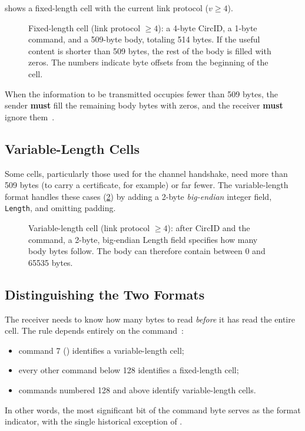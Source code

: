  shows a fixed-length cell with the current link protocol ($v\ge4$).

\begin{figure}[htbp]
\centering

\caption{Fixed-length cell (link protocol $\ge 4$): a 4-byte CircID, a 1-byte command, and a 509-byte body, totaling 514 bytes. If the useful content is shorter than 509 bytes, the rest of the body is filled with zeros. The numbers indicate byte offsets from the beginning of the cell.}
\label{fig:cella-fissa}
\end{figure}

When the information to be transmitted occupies fewer than 509 bytes, the sender \textbf{must} fill the remaining body bytes with zeros, and the receiver \textbf{must} ignore them~.

\subsection{Variable-Length Cells}

Some cells, particularly those used for the channel handshake, need more than 509 bytes (to carry a certificate, for example) or far fewer. The variable-length format handles these cases (\cref{fig:cella-variabile}) by adding a 2-byte \emph{big-endian} integer field, \texttt{Length}, and omitting padding.

\begin{figure}[htbp]
\centering

\caption{Variable-length cell (link protocol $\ge 4$): after CircID and the command, a 2-byte, big-endian Length field specifies how many body bytes follow. The body can therefore contain between 0 and \num{65535} bytes.}
\label{fig:cella-variabile}
\end{figure}

\subsection{Distinguishing the Two Formats}

The receiver needs to know how many bytes to read \emph{before} it has read the entire cell. The rule depends entirely on the command~:
\begin{itemize}
  \item command 7 () identifies a variable-length cell;
  \item every other command below 128 identifies a fixed-length cell;
  \item commands numbered 128 and above identify variable-length cells.
\end{itemize}
In other words, the most significant bit of the command byte serves as the format indicator, with the single historical exception of .

